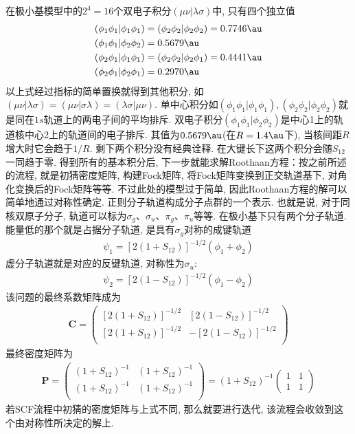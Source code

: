 在极小基模型中的$2^4=16$个双电子积分$(\mu\nu|\lambda\sigma)$中, 
只有四个独立值
\begin{equation}
	\begin{split}
		(\phi_1\phi_1|\phi_1\phi_1) & = (\phi_2\phi_2|\phi_2\phi_2) = 0.7746\au\\
		(\phi_1\phi_1|\phi_2\phi_2) & =0.5679\au\\
	\label{3.236}
		(\phi_2\phi_1|\phi_1\phi_1) & =(\phi_2\phi_2|\phi_2\phi_1) = 0.4441\au\\
		(\phi_2\phi_1|\phi_2\phi_1) & =0.2970\au
	\end{split}
\end{equation}
以上式经过指标的简单置换就得到其他积分, 
如$(\mu\nu|\lambda\sigma)=(\mu\nu|\sigma\lambda)=(\lambda\sigma|\mu\nu)$. 
单中心积分如$(\phi_1\phi_1|\phi_1\phi_1),(\phi_2\phi_2|\phi_2\phi_2)$就是同在$1s$轨道上的两电子间的平均排斥. 
双电子积分$(\phi_1\phi_1|\phi_2\phi_2)$是中心1上的轨道核中心2上的轨道间的电子排斥. 
其值为$0.5679\au$(在$R=1.4\au$下), 
当核间距$R$增大时它会趋于$1/R$. 
剩下两个积分没有经典诠释. 
在大键长下这两个积分会随$S_{12}$一同趋于零. 
得到所有的基本积分后, 
下一步就能求解Roothaan方程：按之前所述的流程, 
就是初猜密度矩阵, 
构建Fock矩阵, 
将Fock矩阵变换到正交轨道基下, 
对角化变换后的Fock矩阵等等. 
不过此处的模型过于简单, 
因此Roothaan方程的解可以简单地通过对称性确定. 
正则分子轨道构成分子点群的一个表示. 
也就是说, 
对于同核双原子分子, 
轨道可以标为$\sigma_g$、$\sigma_u$、$\pi_g$、$\pi_u$等等. 
在极小基下只有两个分子轨道. 
能量低的那个就是占据分子轨道, 
是具有$\sigma_g$对称的成键轨道
\begin{align}
	\psi_1 = [2(1+S_{12})]^{-1/2}(\phi_1+\phi_2)
\end{align}
虚分子轨道就是对应的反键轨道, 
对称性为$\sigma_u$:
\begin{align}
	\psi_2 = [2(1-S_{12})]^{-1/2}(\phi_1-\phi_2)
\end{align}
该问题的最终系数矩阵成为
\begin{align}
	\mathbf{C}=
	\begin{pmatrix}
		[2(1+S_{12})]^{-1/2} & [2(1-S_{12})]^{-1/2}\\
		[2(1+S_{12})]^{-1/2} & -[2(1-S_{12})]^{-1/2}\\
	\end{pmatrix}
\end{align}
最终密度矩阵为
\begin{align}
	\label{3.239}
	\mathbf{P}=
	\begin{pmatrix}
		(1+S_{12})^{-1} & (1+S_{12})^{-1} \\
		(1+S_{12})^{-1} & (1+S_{12})^{-1} \\
	\end{pmatrix}
	=(1+S_{12})^{-1} 
	\begin{pmatrix}
		1&1\\1&1
	\end{pmatrix}
\end{align}
若SCF流程中初猜的密度矩阵与上式不同, 
那么就要进行迭代, 
该流程会收敛到这个由对称性所决定的解上.

